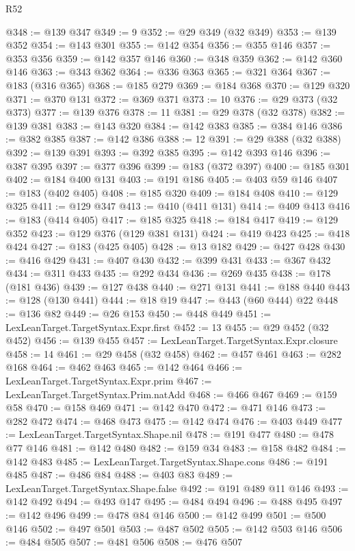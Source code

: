 \begin{lexlean}{R52}
\begin{coremodule}
{{{{{{{{{{{{{{{{{{{{{{{{{{{{{{{{{{{{{{{{{{{{{{{{{{{{{{{{{{{{{{{{{{{{{{{{{{{{{{{{{{{{{{{{{{{{{{{{{{{{{{{{{{{{{{{{{{{{{{{{{{{{{{{{{{{{{{{{{{{{{{{{{{{{{{{{{{{{{{{{{{{{{{{{{{{{{{{{{{{{{{{{{{{{{{{{{{{{{{@348 := @139 @347
@349 := 9
@352 := @29 @349 (@32 @349)
@353 := @139 @352
@354 := @143 @301
@355 := @142 @354
@356 := @355 @146
@357 := @353 @356
@359 := @142 @357 @146
@360 := @348 @359
@362 := @142 @360 @146
@363 := @343 @362
@364 := @336 @363
@365 := @321 @364
@367 := @183 (@316 @365)
@368 := @185 @279
@369 := @184 @368
@370 := @129 @320
@371 := @370 @131
@372 := @369 @371
@373 := 10
@376 := @29 @373 (@32 @373)
@377 := @139 @376
@378 := 11
@381 := @29 @378 (@32 @378)
@382 := @139 @381
@383 := @143 @320
@384 := @142 @383
@385 := @384 @146
@386 := @382 @385
@387 := @142 @386
@388 := 12
@391 := @29 @388 (@32 @388)
@392 := @139 @391
@393 := @392 @385
@395 := @142 @393 @146
@396 := @387 @395
@397 := @377 @396
@399 := @183 (@372 @397)
@400 := @185 @301
@402 := @184 @400 @131
@403 := @191 @186
@405 := @403 @59 @146
@407 := @183 (@402 @405)
@408 := @185 @320
@409 := @184 @408
@410 := @129 @325
@411 := @129 @347
@413 := @410 (@411 @131)
@414 := @409 @413
@416 := @183 (@414 @405)
@417 := @185 @325
@418 := @184 @417
@419 := @129 @352
@423 := @129 @376 (@129 @381 @131)
@424 := @419 @423
@425 := @418 @424
@427 := @183 (@425 @405)
@428 := @13 @182
@429 := @427 @428
@430 := @416 @429
@431 := @407 @430
@432 := @399 @431
@433 := @367 @432
@434 := @311 @433
@435 := @292 @434
@436 := @269 @435
@438 := @178 (@181 @436)
@439 := @127 @438
@440 := @271 @131
@441 := @188 @440
@443 := @128 (@130 @441)
@444 := @18 @19
@447 := @443 (@60 @444) @22
@448 := @136 @82
@449 := @26 @153
@450 := @448 @449
@451 := LexLeanTarget.TargetSyntax.Expr.first
@452 := 13
@455 := @29 @452 (@32 @452)
@456 := @139 @455
@457 := LexLeanTarget.TargetSyntax.Expr.closure
@458 := 14
@461 := @29 @458 (@32 @458)
@462 := @457 @461
@463 := @282 @168
@464 := @462 @463
@465 := @142 @464
@466 := LexLeanTarget.TargetSyntax.Expr.prim
@467 := LexLeanTarget.TargetSyntax.Prim.natAdd
@468 := @466 @467
@469 := @159 @58
@470 := @158 @469
@471 := @142 @470
@472 := @471 @146
@473 := @282 @472
@474 := @468 @473
@475 := @142 @474
@476 := @403 @449
@477 := LexLeanTarget.TargetSyntax.Shape.nil
@478 := @191 @477
@480 := @478 @77 @146
@481 := @142 @480
@482 := @159 @34
@483 := @158 @482
@484 := @142 @483
@485 := LexLeanTarget.TargetSyntax.Shape.cons
@486 := @191 @485
@487 := @486 @84
@488 := @403 @83
@489 := LexLeanTarget.TargetSyntax.Shape.false
@492 := @191 @489 @11 @146
@493 := @142 @492
@494 := @493 @147
@495 := @484 @494
@496 := @488 @495
@497 := @142 @496
@499 := @478 @84 @146
@500 := @142 @499
@501 := @500 @146
@502 := @497 @501
@503 := @487 @502
@505 := @142 @503 @146
@506 := @484 @505
@507 := @481 @506
@508 := @476 @507
}}}}}}}}}}}}}}}}}}}}}}}}}}}}}}}}}}}}}}}}}}}}}}}}}}}}}}}}}}}}}}}}}}}}}}}}}}}}}}}}}}}}}}}}}}}}}}}}}}}}}}}}}}}}}}}}}}}}}}}}}}}}}}}}}}}}}}}}}}}}}}}}}}}}}}}}}}}}}}}}}}}}}}}}}}}}}}}}}}}}}}}}}}}}}}}}}}}}}}
\end{coremodule}
\end{lexlean}
